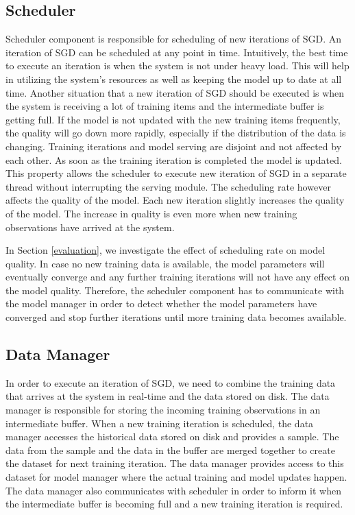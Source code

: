 \documentclass{vldb}
\begin{document}
\subsection{Scheduler}\label{scheduler}
Scheduler component is responsible for scheduling of new iterations of SGD.
An iteration of SGD can be scheduled at any point in time.
Intuitively, the best time to execute an iteration is when the system is not under heavy load.
This will help in utilizing the system's resources as well as keeping the model up to date at all time.
Another situation that a new iteration of SGD should be executed is when the system is receiving a lot of training items and the intermediate buffer is getting full.
If the model is not updated with the new training items frequently, the quality will go down more rapidly, especially if the distribution of the data is changing.
Training iterations and model serving are disjoint and not affected by each other.
As soon as the training iteration is completed the model is updated.
This property allows the scheduler to execute new iteration of SGD in a separate thread without interrupting the serving module.
The scheduling rate however affects the quality of the model.
Each new iteration slightly increases the quality of the model.
The increase in quality is even more when new training observations have arrived at the system.

In Section \ref{evaluation}, we investigate the effect of scheduling rate on model quality.
In case no new training data is available, the model parameters will eventually converge and any further training iterations will not have any effect on the model quality.
Therefore, the scheduler component has to communicate with the model manager in order to detect whether the model parameters have converged and stop further iterations until more training data becomes available.

\subsection{Data Manager} \label{data-manager}
In order to execute an iteration of SGD, we need to combine the training data that arrives at the system in real-time and the data stored on disk.
The data manager is responsible for storing the incoming training observations in an intermediate buffer.
When a new training iteration is scheduled, the data manager accesses the historical data stored on disk and provides a sample.
The data from the sample and the data in the buffer are merged together to create the dataset for next training iteration.
The data manager provides access to this dataset for model manager where the actual training and model updates happen.
The data manager also communicates with scheduler in order to inform it when the intermediate buffer is becoming full and a new training iteration is required. 
\end{document}
